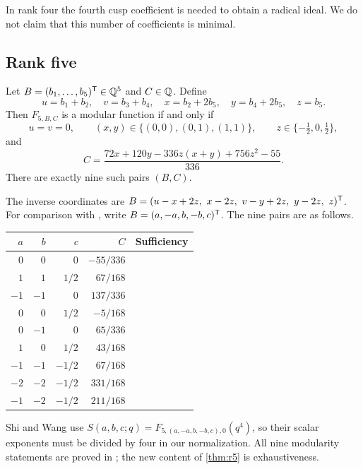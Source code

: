 In rank four the fourth cusp coefficient is needed to obtain a radical ideal. We do not claim that this number of coefficients is minimal.

\subsection{Rank five}

\begin{theorem}\label{thm:r5}
Let $B=(b_1,\dots,b_5)^{\mathsf{T}}\in\mathbb{Q}^5$ and $C\in\mathbb{Q}$. Define
\[
u=b_1+b_2,\quad v=b_3+b_4,\quad x=b_2+2b_5,\quad y=b_4+2b_5,\quad z=b_5.
\]
Then $F_{5,B,C}$ is a modular function if and only if
\begin{equation}\label{eq:r5set}
u=v=0,\qquad (x,y)\in\{(0,0),(0,1),(1,1)\},\qquad z\in\{-\tfrac12,0,\tfrac12\},
\end{equation}
and
\begin{equation}\label{eq:r5C}
C=\frac{72x+120y-336z(x+y)+756z^2-55}{336}.
\end{equation}
There are exactly nine such pairs $(B,C)$.
\end{theorem}

The inverse coordinates are $B=(u-x+2z,\ x-2z,\ v-y+2z,\ y-2z,\ z)^\T$. For comparison with \cite[Theorem~5.2]{SW26}, write $B=(a,-a,b,-b,c)^{\mathsf{T}}$. The nine pairs are as follows.
\begin{center}
\begin{tabular}{rrrrl}
\toprule
$a$ & $b$ & $c$ & $C$ & Sufficiency\\
\midrule
$0$ & $0$ & $0$ & $-55/336$ & \cite[(5.29)]{SW26}\\
$1$ & $1$ & $1/2$ & $67/168$ & \cite[(5.30)]{SW26}\\
$-1$ & $-1$ & $0$ & $137/336$ & \cite[(5.31)]{SW26}\\
$0$ & $0$ & $1/2$ & $-5/168$ & \cite[(5.32)]{SW26}\\
$0$ & $-1$ & $0$ & $65/336$ & \cite[(5.33)]{SW26}\\
$1$ & $0$ & $1/2$ & $43/168$ & \cite[(5.34)]{SW26}\\
$-1$ & $-1$ & $-1/2$ & $67/168$ & \cite[(5.35)]{SW26}\\
$-2$ & $-2$ & $-1/2$ & $331/168$ & \cite[(5.36)]{SW26}\\
$-1$ & $-2$ & $-1/2$ & $211/168$ & \cite[(5.37)]{SW26}\\
\bottomrule
\end{tabular}
\end{center}
Shi and Wang use $S(a,b,c;q)=F_{5,(a,-a,b,-b,c),0}(q^4)$, so their scalar exponents must be divided by four in our normalization. All nine modularity statements are proved in \cite{SW26}; the new content of \cref{thm:r5} is exhaustiveness.

